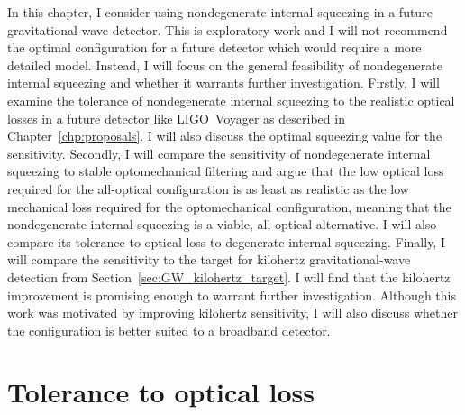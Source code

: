 
In this chapter, I consider using nondegenerate internal squeezing in a future gravitational-wave detector. This is exploratory work and I will not recommend the optimal configuration for a future detector which would require a more detailed model. Instead, I will focus on the general feasibility of nondegenerate internal squeezing and whether it warrants further investigation.
Firstly, I will examine the tolerance of nondegenerate internal squeezing to the realistic optical losses in a future detector like LIGO~Voyager as described in Chapter~\ref{chp:proposals}. I will also discuss the optimal squeezing value for the sensitivity. Secondly, I will compare the sensitivity of nondegenerate internal squeezing to stable optomechanical filtering and argue that the low optical loss required for the all-optical configuration is as least as realistic as the low mechanical loss required for the optomechanical configuration, meaning that the nondegenerate internal squeezing is a viable, all-optical alternative. I will also compare its tolerance to optical loss to degenerate internal squeezing. Finally, I will compare the sensitivity to the target for kilohertz gravitational-wave detection from Section~\ref{sec:GW_kilohertz_target}. I will find that the kilohertz improvement is promising enough to warrant further investigation. Although this work was motivated by improving kilohertz sensitivity, I will also discuss whether the configuration is better suited to a broadband detector. %

\section{Tolerance to optical loss}
\label{sec:nIS_tolerance_to_losses}

